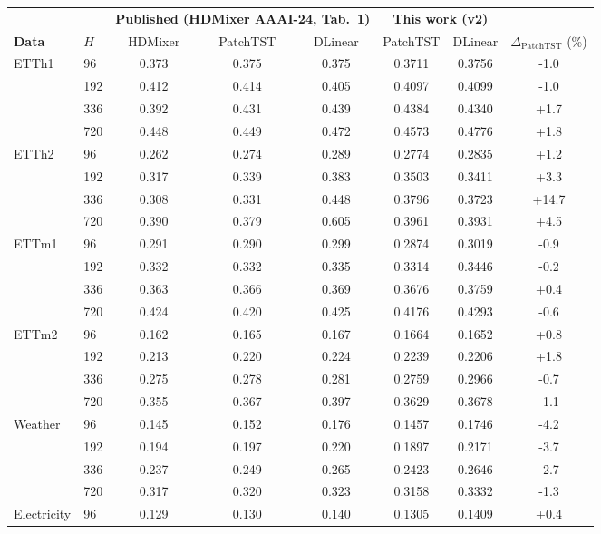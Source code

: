 \begin{tabular}{llcccccc}
\toprule
& & \multicolumn{3}{c}{\textbf{Published (HDMixer AAAI-24, Tab.~1)}} & \multicolumn{2}{c}{\textbf{This work (v2)}} & \\
\cmidrule(lr){3-5} \cmidrule(lr){6-7}
\textbf{Data} & $H$ & HDMixer & PatchTST & DLinear & PatchTST & DLinear & $\Delta_{\text{PatchTST}}$ (\%) \\
\midrule
\multirow{4}{*}{ETTh1} & 96 & 0.373 & 0.375 & 0.375 & 0.3711 & 0.3756 & -1.0 \\
 & 192 & 0.412 & 0.414 & 0.405 & 0.4097 & 0.4099 & -1.0 \\
 & 336 & 0.392 & 0.431 & 0.439 & 0.4384 & 0.4340 & +1.7 \\
 & 720 & 0.448 & 0.449 & 0.472 & 0.4573 & 0.4776 & +1.8 \\
\midrule
\multirow{4}{*}{ETTh2} & 96 & 0.262 & 0.274 & 0.289 & 0.2774 & 0.2835 & +1.2 \\
 & 192 & 0.317 & 0.339 & 0.383 & 0.3503 & 0.3411 & +3.3 \\
 & 336 & 0.308 & 0.331 & 0.448 & 0.3796 & 0.3723 & +14.7 \\
 & 720 & 0.390 & 0.379 & 0.605 & 0.3961 & 0.3931 & +4.5 \\
\midrule
\multirow{4}{*}{ETTm1} & 96 & 0.291 & 0.290 & 0.299 & 0.2874 & 0.3019 & -0.9 \\
 & 192 & 0.332 & 0.332 & 0.335 & 0.3314 & 0.3446 & -0.2 \\
 & 336 & 0.363 & 0.366 & 0.369 & 0.3676 & 0.3759 & +0.4 \\
 & 720 & 0.424 & 0.420 & 0.425 & 0.4176 & 0.4293 & -0.6 \\
\midrule
\multirow{4}{*}{ETTm2} & 96 & 0.162 & 0.165 & 0.167 & 0.1664 & 0.1652 & +0.8 \\
 & 192 & 0.213 & 0.220 & 0.224 & 0.2239 & 0.2206 & +1.8 \\
 & 336 & 0.275 & 0.278 & 0.281 & 0.2759 & 0.2966 & -0.7 \\
 & 720 & 0.355 & 0.367 & 0.397 & 0.3629 & 0.3678 & -1.1 \\
\midrule
\multirow{4}{*}{Weather} & 96 & 0.145 & 0.152 & 0.176 & 0.1457 & 0.1746 & -4.2 \\
 & 192 & 0.194 & 0.197 & 0.220 & 0.1897 & 0.2171 & -3.7 \\
 & 336 & 0.237 & 0.249 & 0.265 & 0.2423 & 0.2646 & -2.7 \\
 & 720 & 0.317 & 0.320 & 0.323 & 0.3158 & 0.3332 & -1.3 \\
\midrule
\multirow{4}{*}{Electricity} & 96 & 0.129 & 0.130 & 0.140 & 0.1305 & 0.1409 & +0.4 \\

\end{tabular}
